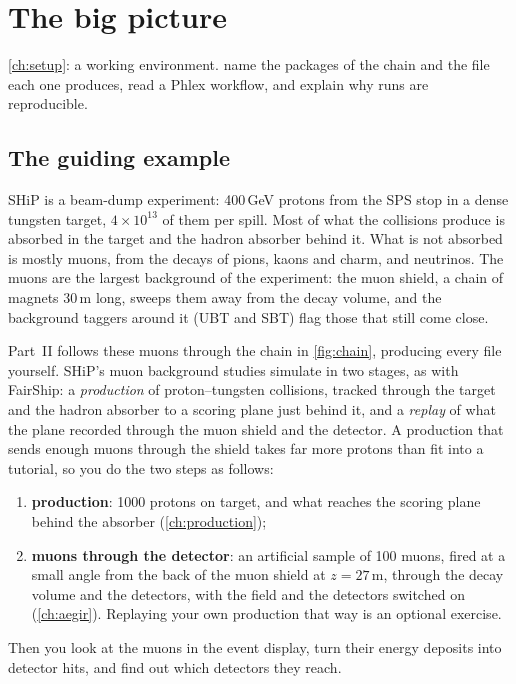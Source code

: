 \chapter{The big picture}
\label{ch:bigpicture}

{\cref{ch:setup}: a working environment.}
{name the packages of the chain and the file each one produces, read a Phlex workflow, and explain why runs are reproducible.}

\section{The guiding example}

SHiP is a beam-dump experiment: 400\,GeV protons from the SPS stop in a
dense tungsten target, $4\times10^{13}$ of them per spill. Most of what the
collisions produce is absorbed in the target and the hadron absorber behind
it. What is not absorbed is mostly muons, from the decays of pions, kaons and
charm, and neutrinos. The muons are the largest background of the
experiment: the muon shield, a chain of magnets 30\,m long, sweeps them away
from the decay volume, and the background taggers around it (UBT and SBT)
flag those that still come close.

Part~II follows these muons through the chain in \cref{fig:chain}, producing
every file yourself. SHiP's muon background studies simulate in two stages, as
with FairShip: a \emph{production} of proton--tungsten collisions, tracked
through the target and the hadron absorber to a scoring plane just behind it,
and a \emph{replay} of what the plane recorded through the muon shield and
the detector. A production that sends enough muons through the shield takes
far more protons than fit into a tutorial, so you do the two steps as follows:
\begin{enumerate}
  \item \textbf{production}: 1000 protons on target, and what reaches the
        scoring plane behind the absorber (\cref{ch:production});
  \item \textbf{muons through the detector}: an artificial sample of 100
        muons, fired at a small angle from the back of the muon shield at
        $z=27$\,m, through the decay volume and the detectors, with the field
        and the detectors switched on (\cref{ch:aegir}). Replaying your own
        production that way is an optional exercise.
\end{enumerate}
Then you look at the muons in the event display, turn their energy deposits
into detector hits, and find out which detectors they reach.

